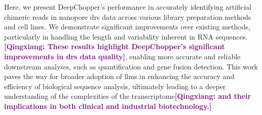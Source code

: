 \documentclass[pdflatex, sn-mathphys-num, lineno]{sn-jnl}%
\newcommand{\qx}[1]{\textcolor{purple}{\textbf{[Qingxiang: #1]}}}
\theoremstyle{thmstyleone}%
\theoremstyle{thmstyletwo}%
\theoremstyle{thmstylethree}%
\begin{document}
Here, we present DeepChopper's performance in accurately identifying artificial chimeric reads in nanopore \gls{drs} data across various library preparation methods and cell lines.
We demonstrate significant improvements over existing methods, particularly in handling the length and variability inherent in RNA sequences.
\qx{These results highlight DeepChopper's significant improvements in \gls{drs} data quality}, enabling more accurate and reliable downstream analyses, such as quantification and gene fusion detection.
This work paves the way for broader adoption of \glspl{llm} in enhancing the accuracy and efficiency of biological sequence analysis, ultimately leading to a deeper understanding of the complexities of the transcriptome\qx{and their implications in both clinical and industrial biotechnology.}


\end{document}
